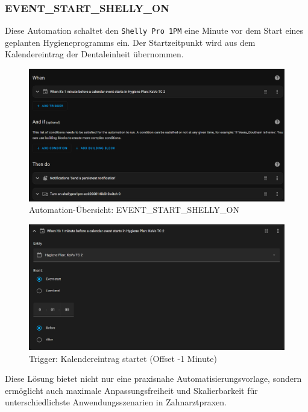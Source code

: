 \subsubsection{EVENT\_START\_SHELLY\_ON}

Diese Automation schaltet den \texttt{Shelly Pro 1PM} eine Minute vor dem Start eines geplanten Hygieneprogramms ein. Der Startzeitpunkt wird aus dem Kalendereintrag der Dentaleinheit übernommen.

\begin{figure}[H]
  \centering
  \includegraphics[width=\linewidth]{images/turnon_overview.png}
  \caption{Automation-Übersicht: EVENT\_START\_SHELLY\_ON}
\end{figure}

\begin{figure}[H]
  \centering
  \includegraphics[width=\linewidth]{images/turnon_trigger.png}
  \caption{Trigger: Kalendereintrag startet (Offset -1 Minute)}
\end{figure}


Diese Lösung bietet nicht nur eine praxisnahe Automatisierungsvorlage, sondern ermöglicht auch maximale Anpassungsfreiheit und Skalierbarkeit für unterschiedlichste Anwendungsszenarien in Zahnarztpraxen.




